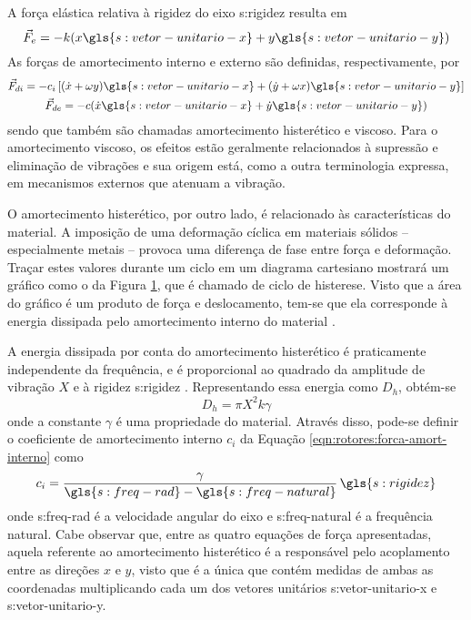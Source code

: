 \documentclass[12pt,oneside,english,brazil]{ucsmono}
\begin{document}
	A força elástica relativa à rigidez do eixo \gls{s:rigidez} resulta em \cite{rao:2008}
	\begin{equation}\label{eqn:rotores:forca-elastica}
		\vec{F}_e = -k(x\gls{s:vetor-unitario-x} + y\gls{s:vetor-unitario-y})
	\end{equation}
	As forças de amortecimento interno e externo são definidas, respectivamente, por \cite{rao:2008}
	\begin{gather}
		\vec{F}_{di} = -c_i\left[(\dot{x} + \omega y)\gls{s:vetor-unitario-x} +
		(\dot{y} + \omega x)\gls{s:vetor-unitario-y} \right] \label{eqn:rotores:forca-amort-interno} \\
		\vec{F}_{de} = -c(\dot{x}\gls{s:vetor-unitario-x} + \dot{y}\gls{s:vetor-unitario-y}) \label{eqn:rotores:forca-amort-externo}
	\end{gather}
	sendo que também são chamadas amortecimento histerético e viscoso. Para o amortecimento viscoso, os efeitos estão geralmente relacionados à supressão e eliminação de vibrações \cite{dimarogonas:1995} e sua origem está, como a outra terminologia expressa, em mecanismos externos que atenuam a vibração.
	
	O amortecimento histerético, por outro lado, é relacionado às características do material. A imposição de uma deformação cíclica em materiais sólidos -- especialmente metais -- provoca uma diferença de fase entre força e deformação. Traçar estes valores durante um ciclo em um diagrama cartesiano mostrará um gráfico como o da Figura \ref{fig:histerese}, que é chamado de ciclo de histerese. Visto que a área do gráfico é um produto de força e deslocamento, tem-se que ela corresponde à energia dissipada pelo amortecimento interno do material \cite{dimarogonas:1995}. 
	\begin{figure}[b]
		\label{fig:histerese}
	\end{figure}

	A energia dissipada por conta do amortecimento histerético é praticamente independente da frequência, e é proporcional ao quadrado da amplitude de vibração $ X $ e à rigidez \gls{s:rigidez} \cite{dimarogonas:1995}. Representando essa energia como $ D_h $, obtém-se
	\begin{equation}
		D_h = \pi X^2k\gamma
	\end{equation}
	onde a constante $ \gamma $ é uma propriedade do material. Através disso, pode-se definir o coeficiente de amortecimento interno $ c_i $ da Equação \ref{eqn:rotores:forca-amort-interno} como \cite{dimarogonas:1995}
	\begin{equation}
		c_i = \frac{\gamma}{\gls{s:freq-rad} - \gls{s:freq-natural}}\,\gls{s:rigidez}
	\end{equation}
	onde \gls{s:freq-rad} é a velocidade angular do eixo e \gls{s:freq-natural} é a frequência natural. Cabe observar que, entre as quatro equações de força apresentadas, aquela referente ao amortecimento histerético é a responsável pelo acoplamento entre as direções $ x $ e $ y $, visto que é a única que contém medidas de ambas as coordenadas multiplicando cada um dos vetores unitários \gls{s:vetor-unitario-x} e \gls{s:vetor-unitario-y}.
	
\end{document}
